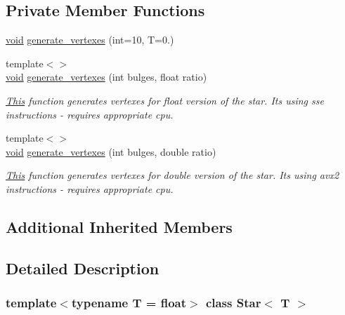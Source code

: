 \subsection*{Private Member Functions}
\begin{DoxyCompactItemize}
\item 
\mbox{\hyperlink{glad_8h_a950fc91edb4504f62f1c577bf4727c29}{void}} \mbox{\hyperlink{classStar_ac9ce42a8f7289484594f7f0ab5124849}{generate\+\_\+vertexes}} (int=10, T=0.)
\item 
{\footnotesize template$<$$>$ }\\\mbox{\hyperlink{glad_8h_a950fc91edb4504f62f1c577bf4727c29}{void}} \mbox{\hyperlink{classStar_ab46cbc7aca971bc1c07b8d4afe8fba37}{generate\+\_\+vertexes}} (int bulges, float ratio)
\begin{DoxyCompactList}\small\item\em \mbox{\hyperlink{classThis}{This}} function generates vertexes for float version of the star. It\textquotesingle{}s using sse instructions -\/ requires appropriate cpu. \end{DoxyCompactList}\item 
{\footnotesize template$<$$>$ }\\\mbox{\hyperlink{glad_8h_a950fc91edb4504f62f1c577bf4727c29}{void}} \mbox{\hyperlink{classStar_a85d8438cea72701a136b76f046ee95dd}{generate\+\_\+vertexes}} (int bulges, double ratio)
\begin{DoxyCompactList}\small\item\em \mbox{\hyperlink{classThis}{This}} function generates vertexes for double version of the star. It\textquotesingle{}s using avx2 instructions -\/ requires appropriate cpu. \end{DoxyCompactList}\end{DoxyCompactItemize}
\subsection*{Additional Inherited Members}


\subsection{Detailed Description}
\subsubsection*{template$<$typename T = float$>$\newline
class Star$<$ T $>$}

